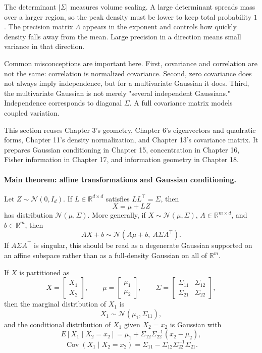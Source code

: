 The determinant \(|\Sigma|\) measures volume scaling. A large determinant spreads mass over a larger region, so the peak density must be lower to keep total probability \(1\). The precision matrix \(\Lambda\) appears in the exponent and controls how quickly density falls away from the mean. Large precision in a direction means small variance in that direction.

Common misconceptions are important here. First, covariance and correlation are not the same: correlation is normalized covariance. Second, zero covariance does not always imply independence, but for a multivariate Gaussian it does. Third, the multivariate Gaussian is not merely "several independent Gaussians." Independence corresponds to diagonal \(\Sigma\). A full covariance matrix models coupled variation.

This section reuses Chapter 3's geometry, Chapter 6's eigenvectors and quadratic forms, Chapter 11's density normalization, and Chapter 13's covariance matrix. It prepares Gaussian conditioning in Chapter 15, concentration in Chapter 16, Fisher information in Chapter 17, and information geometry in Chapter 18.

\paragraph{Main theorem: affine transformations and Gaussian conditioning.}
Let \(Z\sim\mathcal N(0,I_d)\). If \(L\in\mathbb R^{d\times d}\) satisfies \(LL^\top=\Sigma\), then
\[
X=\mu+LZ
\]
has distribution \(\mathcal N(\mu,\Sigma)\). More generally, if \(X\sim\mathcal N(\mu,\Sigma)\), \(A\in\mathbb R^{m\times d}\), and \(b\in\mathbb R^m\), then
\[
AX+b\sim\mathcal N(A\mu+b,\ A\Sigma A^\top).
\]
If \(A\Sigma A^\top\) is singular, this should be read as a degenerate Gaussian supported on an affine subspace rather than as a full-density Gaussian on all of \(\mathbb R^m\).

If \(X\) is partitioned as
\[
X=
\begin{bmatrix}X_1\\X_2\end{bmatrix},
\qquad
\mu=
\begin{bmatrix}\mu_1\\\mu_2\end{bmatrix},
\qquad
\Sigma=
\begin{bmatrix}
\Sigma_{11} & \Sigma_{12}\\
\Sigma_{21} & \Sigma_{22}
\end{bmatrix},
\]
then the marginal distribution of \(X_1\) is
\[
X_1\sim\mathcal N(\mu_1,\Sigma_{11}),
\]
and the conditional distribution of \(X_1\) given \(X_2=x_2\) is Gaussian with
\[
E[X_1\mid X_2=x_2]
=\mu_1+\Sigma_{12}\Sigma_{22}^{-1}(x_2-\mu_2),
\]
\[
\operatorname{Cov}(X_1\mid X_2=x_2)
=\Sigma_{11}-\Sigma_{12}\Sigma_{22}^{-1}\Sigma_{21}.
\]

